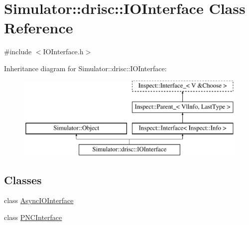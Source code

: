 \hypertarget{class_simulator_1_1drisc_1_1_i_o_interface}{\section{Simulator\+:\+:drisc\+:\+:I\+O\+Interface Class Reference}
\label{class_simulator_1_1drisc_1_1_i_o_interface}
}


{\ttfamily \#include $<$I\+O\+Interface.\+h$>$}

Inheritance diagram for Simulator\+:\+:drisc\+:\+:I\+O\+Interface\+:\begin{figure}[H]
\begin{center}
\leavevmode
\includegraphics[height=4.000000cm]{class_simulator_1_1drisc_1_1_i_o_interface}
\end{center}
\end{figure}
\subsection*{Classes}
\begin{DoxyCompactItemize}
\item 
class \hyperlink{class_simulator_1_1drisc_1_1_i_o_interface_1_1_async_i_o_interface}{Async\+I\+O\+Interface}
\item 
class \hyperlink{class_simulator_1_1drisc_1_1_i_o_interface_1_1_p_n_c_interface}{P\+N\+C\+Interface}
\end{DoxyCompactItemize}
